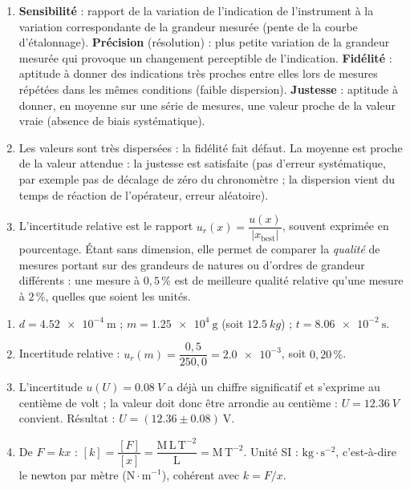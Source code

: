 \documentclass[11pt]{article}
\newcommand{\cle}[1]{{\popxbold\color{popdark}#1}}
\begin{document}
\begin{corrige}
\begin{enumerate}
    \item \textbf{Sensibilité} : rapport de la variation de l'indication de l'instrument à la variation correspondante de la grandeur mesurée (pente de la courbe d'étalonnage). \textbf{Précision} (résolution) : plus petite variation de la grandeur mesurée qui provoque un changement perceptible de l'indication. \textbf{Fidélité} : aptitude à donner des indications très proches entre elles lors de mesures répétées dans les mêmes conditions (faible dispersion). \textbf{Justesse} : aptitude à donner, en moyenne sur une série de mesures, une valeur proche de la valeur vraie (absence de biais systématique).
    \item Les valeurs sont très dispersées : la \cle{fidélité} fait défaut. La moyenne est proche de la valeur attendue : la \cle{justesse} est satisfaite (pas d'erreur systématique, par exemple pas de décalage de zéro du chronomètre ; la dispersion vient du temps de réaction de l'opérateur, erreur aléatoire).
    \item L'\cle{incertitude relative} est le rapport $u_r(x) = \dfrac{u(x)}{|x_{\text{best}}|}$, souvent exprimée en pourcentage. Étant sans dimension, elle permet de comparer la \emph{qualité} de mesures portant sur des grandeurs de natures ou d'ordres de grandeur différents : une mesure à $0,5\,\%$ est de meilleure qualité relative qu'une mesure à $2\,\%$, quelles que soient les unités.
\end{enumerate}
\end{corrige}

\begin{corrige}
\begin{enumerate}
    \item $d = \num{4,52e-4}~\text{m}$ ; $m = \num{1,25e4}~\text{g}$ (soit $\SI{12,5}{kg}$) ; $t = \num{8,06e-2}~\text{s}$.
    \item Incertitude relative : $u_r(m) = \dfrac{0,5}{250,0} = \num{2,0e-3}$, soit $\boxed{0,20\,\%}$.
    \item L'incertitude $u(U) = \SI{0,08}{V}$ a déjà un chiffre significatif et s'exprime au centième de volt ; la valeur doit donc être arrondie au centième : $U = \SI{12,36}{V}$ convient. Résultat : $\boxed{U = (\num{12,36} \pm \num{0,08})~\text{V}}$.
    \item De $F = kx$ : $[k] = \dfrac{[F]}{[x]} = \dfrac{\text{M}\,\text{L}\,\text{T}^{-2}}{\text{L}} = \boxed{\text{M}\,\text{T}^{-2}}$. Unité SI : $\text{kg}\cdot\text{s}^{-2}$, c'est-à-dire le newton par mètre ($\text{N}\cdot\text{m}^{-1}$), cohérent avec $k = F/x$.
\end{enumerate}
\end{corrige}
\end{document}
